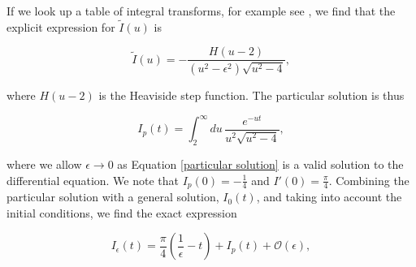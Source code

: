 \documentclass{article}
\numberwithin{equation}{section} %
\begin{document}
\noindent If we look up a table of integral transforms, for example see \cite{laplace}, we find that the explicit expression for $\tilde{I}(u)$ is

\begin{equation}
\tilde{I}(u) = -\frac{H(u-2)}{(u^2-\epsilon^2)\sqrt{u^2-4}},
\end{equation}

\noindent where $H(u-2)$ is the Heaviside step function. The particular solution is thus 

\begin{equation}
I_p(t) = \int^\infty_2 du \, \frac{e^{-ut}}{u^2\sqrt{u^2-4}},
\label{particular solution}
\end{equation}

\noindent where we allow $\epsilon\rightarrow 0$ as Equation \ref{particular solution} is a valid solution to the differential equation. We note that $I_p(0) = -\frac{1}{4}$ and $I'(0) = \frac{\pi}{4}$. Combining the particular solution with a general solution, $I_0(t)$, and taking into account the initial conditions, we find the exact expression


\begin{equation}
I_\epsilon(t) = \frac{\pi}{4}(\frac{1}{\epsilon}-t) + I_p(t) +\mathcal{O}(\epsilon),
\label{I full solution}
\end{equation}
\end{document}
